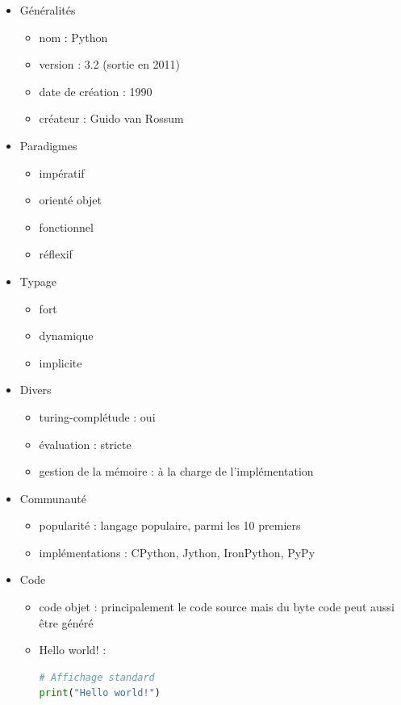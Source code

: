 \renewcommand{\labelitemi}{\textbullet}
\begin{itemize}
\item Généralités
	\begin{itemize}
	\item nom : Python
	\item version : 3.2 (sortie en 2011)
	\item date de création : 1990
	\item créateur : Guido van Rossum\\
	\end{itemize}
\item Paradigmes
	\begin{itemize}
	\item impératif
	\item orienté objet
	\item fonctionnel
	\item réflexif\\
	\end{itemize}
\item Typage
	\begin{itemize}
	\item fort
	\item dynamique
	\item implicite\\
	\end{itemize}
\item Divers
	\begin{itemize}
	\item turing-complétude : oui
	\item évaluation : stricte
	\item gestion de la mémoire : à la charge de l'implémentation\\
	\end{itemize}
\item Communauté
	\begin{itemize}
	\item popularité : langage populaire, parmi les 10 premiers
	\item implémentations : CPython, Jython, IronPython, PyPy\\
	\end{itemize}
\item Code
	\begin{itemize}
	\item code objet : principalement le code source mais du byte code peut aussi être généré
	\item Hello world! :
\begin{lstlisting}[language=python]
# Affichage standard
print("Hello world!")
\end{lstlisting}
	\end{itemize}
\end{itemize}

